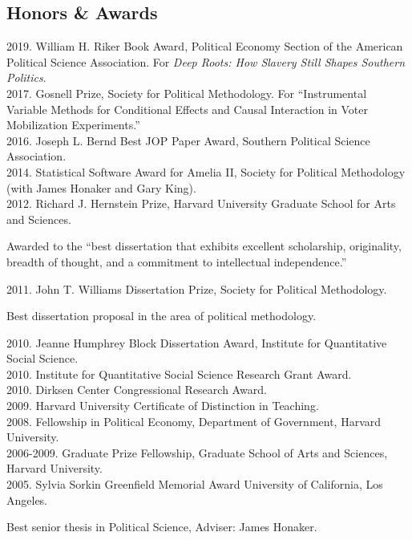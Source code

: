 \documentclass[margin,line,12pt]{res}
\newenvironment{list1}{
  \begin{list}{\ding{113}}{%
      \setlength{\itemsep}{0in}
      \setlength{\parsep}{0in} \setlength{\parskip}{0in}
      \setlength{\topsep}{0in} \setlength{\partopsep}{0in} 
      \setlength{\leftmargin}{0.83 cm}}}{\end{list}}
\begin{document}
\begin{resume}
\section{\sc Honors \&\hspace{1em} Awards}
2019. William H. Riker Book Award, Political Economy Section of the American Political Science Association. For \emph{Deep Roots: How Slavery Still Shapes Southern Politics}. \\
2017. Gosnell Prize, Society for Political Methodology. For ``Instrumental Variable Methods for Conditional Effects and Causal Interaction in Voter Mobilization Experiments.'' \\
2016. Joseph L. Bernd Best JOP Paper Award, Southern Political Science Association.  \\
2014. Statistical Software Award for Amelia II, Society for Political Methodology (with James Honaker and Gary King).\\
2012. Richard J. Hernstein Prize, Harvard University Graduate School
for Arts and Sciences.
\begin{list1}
\item[] Awarded to the ``best dissertation that exhibits excellent scholarship, originality, breadth of 
thought, and a commitment to intellectual independence.''
\end{list1}
\vspace{-1em}
2011. John T. Williams Dissertation Prize, Society for Political Methodology.
\begin{list1} 
\item[] Best dissertation proposal in the area of political methodology.
\end{list1}
\vspace{-1em}
2010. Jeanne Humphrey Block Dissertation Award, Institute for Quantitative Social Science. \\
2010. Institute for Quantitative Social Science Research Grant Award.\\
2010. Dirksen Center Congressional Research Award.\\
2009. Harvard University Certificate of Distinction in Teaching. \\
2008. Fellowship in Political Economy, Department of Government, Harvard
University.\\
2006-2009. Graduate Prize Fellowship, Graduate School of Arts and Sciences, Harvard
University.\\
2005. Sylvia Sorkin Greenfield Memorial Award University of California, Los Angeles.
\begin{list1} 
\item[] Best senior thesis in Political Science, Adviser: James Honaker.
\end{list1}




\end{resume}
\end{document}
